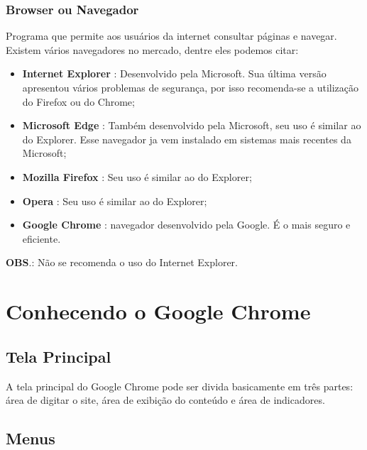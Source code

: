 \documentclass[hidelinks,12pt]{article}
\begin{document}
	\subsubsection{Browser ou Navegador}
	Programa que permite aos usuários da internet consultar páginas e navegar. Existem vários navegadores no mercado, dentre eles podemos citar:
		\begin{itemize}
			\item \textbf{Internet Explorer} : Desenvolvido pela Microsoft. Sua última versão apresentou vários problemas de segurança, por isso recomenda-se a utilização do Firefox ou do Chrome;
			\item \textbf{Microsoft Edge} : Também desenvolvido pela Microsoft, seu uso é similar ao do Explorer. Esse navegador ja vem instalado em sistemas mais recentes da Microsoft;
			\item \textbf{Mozilla Firefox} : Seu uso é similar ao do Explorer;
			\item \textbf{Opera} : Seu uso é similar ao do Explorer;
			\item \textbf{Google Chrome} : navegador desenvolvido pela Google. É o mais seguro e eficiente.
		\end{itemize}
		\textbf{OBS}.: Não se recomenda o uso do Internet Explorer.

\section{Conhecendo o Google Chrome}
		\subsection{Tela Principal}
		A tela principal do Google Chrome pode ser divida basicamente em três partes: área de digitar o site, área de exibição do conteúdo e área de indicadores.

		\subsection{Menus}
\end{document}
